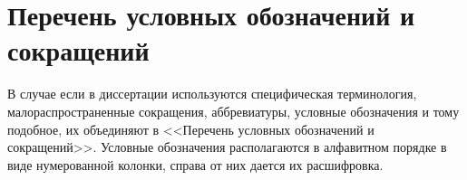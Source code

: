 \chapter*{Перечень условных обозначений и сокращений}
В случае если в диссертации используются специфическая терминология, малораспространенные сокращения, аббревиатуры, условные обозначения и тому подобное, их объединяют в <<Перечень условных обозначений и сокращений>>. Условные обозначения располагаются в алфавитном порядке в виде нумерованной колонки, справа от них дается их расшифровка.
